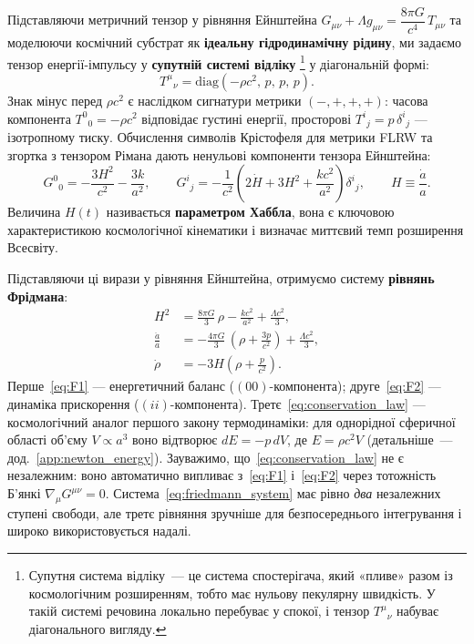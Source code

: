 Підставляючи метричний тензор у рівняння Ейнштейна
$G_{\mu\nu} + \Lambda g_{\mu\nu} = \dfrac{8\pi G}{c^4}\,T_{\mu\nu}$ та моделюючи космічний
субстрат як \textbf{ідеальну гідродинамічну рідину}, ми задаємо тензор
енергії-імпульсу у \textbf{супутній системі відліку}%
\footnote{Супутня система відліку~--- це система спостерігача, який
  «пливе» разом із космологічним розширенням, тобто має нульову пекулярну
  швидкість. У такій системі речовина локально перебуває у спокої, і
  тензор $T^{\mu}{}_\nu$ набуває діагонального вигляду.}
у діагональній формі:
\begin{equation*}
  T^\mu{}_\nu = \mathrm{diag}(-\rho c^2,\,p,\,p,\,p).
\end{equation*}
Знак мінус перед $\rho c^2$ є наслідком сигнатури метрики $(-,+,+,+)$:
часова компонента $T^0{}_0 = -\rho c^2$ відповідає густині енергії,
просторові $T^i{}_j = p\,\delta^i{}_j$ --- ізотропному тиску.
Обчислення символів Крістофеля для метрики FLRW та згортка з тензором
Рімана дають ненульові компоненти тензора Ейнштейна:
\begin{equation*}
  G^0{}_0 = -\frac{3H^2}{c^2} - \frac{3k}{a^2},
  \qquad
  G^i{}_j = -\frac{1}{c^2}\!\left(2\dot H + 3H^2 + \frac{kc^2}{a^2}\right)\delta^i{}_j,
  \qquad
  H \equiv \frac{\dot a}{a}.
\end{equation*}
Величина $H(t)$ називається \textbf{параметром Хаббла}, вона
є ключовою характеристикою космологічної кінематики і визначає
миттєвий темп розширення Всесвіту.

Підставляючи ці вирази у рівняння Ейнштейна, отримуємо систему
\textbf{рівнянь Фрідмана}:
\begin{subequations}\label{eq:friedmann_system}
\begin{align}
  H^2 &= \frac{8\pi G}{3}\,\rho - \frac{kc^2}{a^2} + \frac{\Lambda c^2}{3},
  \label{eq:F1}\\[4pt]
  \frac{\ddot a}{a} &= -\frac{4\pi G}{3}\,\left(\rho + \frac{3p}{c^2}\right) + \frac{\Lambda c^2}{3},
  \label{eq:F2}\\[4pt]
  \dot\rho &= -3H\left(\rho + \frac{p}{c^2}\right).
  \label{eq:conservation_law}
\end{align}
\end{subequations}
Перше~\eqref{eq:F1} --- енергетичний баланс ($(00)$-компонента);
друге~\eqref{eq:F2} --- динаміка прискорення ($(ii)$-компонента).
Третє~\eqref{eq:conservation_law} --- космологічний аналог першого
закону термодинаміки: для однорідної сферичної області об'єму
$V \propto a^3$ воно відтворює $dE = -p\,dV$, де $E = \rho c^2 V$
(детальніше~--- дод.~\ref{app:newton_energy}).
Зауважимо, що~\eqref{eq:conservation_law} не є незалежним: воно
автоматично випливає з~\eqref{eq:F1} і~\eqref{eq:F2} через
тотожність Б'янкі $\nabla_\mu G^{\mu\nu} = 0$.
Система~\eqref{eq:friedmann_system} має рівно \emph{два} незалежних
ступені свободи, але третє рівняння зручніше для безпосереднього
інтегрування і широко використовується надалі.

